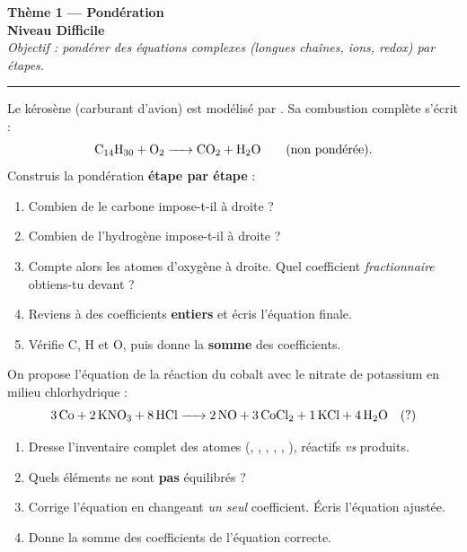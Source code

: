 \documentclass[11pt,a4paper]{article}
\begin{document}
\begin{center}
{\LARGE\bfseries\color{primarydark}Thème 1 — Pondération}\\[1pt]
{\large\color{difcol}\textbf{Niveau Difficile}}\\[2pt]
{\itshape Objectif : pondérer des équations complexes (longues chaînes, ions, redox) par étapes.}\\
{\color{primary}\rule{0.6\linewidth}{1pt}}
\end{center}

\begin{exo}
Le kérosène (carburant d'avion) est modélisé par . Sa combustion complète s'écrit :
\[ \ce{C14H30 + O2 -> CO2 + H2O}\qquad\text{(non pondérée).} \]
Construis la pondération \textbf{étape par étape} :
\begin{enumerate}[label=\textbf{\alph*)},leftmargin=2em,topsep=1pt,itemsep=1.5pt]
  \item Combien de  le carbone impose-t-il à droite ?
  \item Combien de  l'hydrogène impose-t-il à droite ?
  \item Compte alors les atomes d'oxygène à droite. Quel coefficient \emph{fractionnaire} obtiens-tu
        devant  ?
  \item Reviens à des coefficients \textbf{entiers} et écris l'équation finale.
  \item Vérifie C, H et O, puis donne la \textbf{somme} des coefficients.
\end{enumerate}
\end{exo}

\begin{exo}
On propose l'équation de la réaction du cobalt avec le nitrate de potassium en milieu chlorhydrique :
\[ \ce{3 Co + 2 KNO3 + 8 HCl -> 2 NO + 3 CoCl2 + 1 KCl + 4 H2O}\quad(?) \]
\begin{enumerate}[label=\textbf{\alph*)},leftmargin=2em,topsep=1pt,itemsep=1.5pt]
  \item Dresse l'inventaire complet des atomes (, , , , , ),
        réactifs \emph{vs} produits.
  \item Quels éléments ne sont \textbf{pas} équilibrés ?
  \item Corrige l'équation en changeant \emph{un seul} coefficient. Écris l'équation ajustée.
  \item Donne la somme des coefficients de l'équation correcte.
\end{enumerate}
\end{exo}
\end{document}

